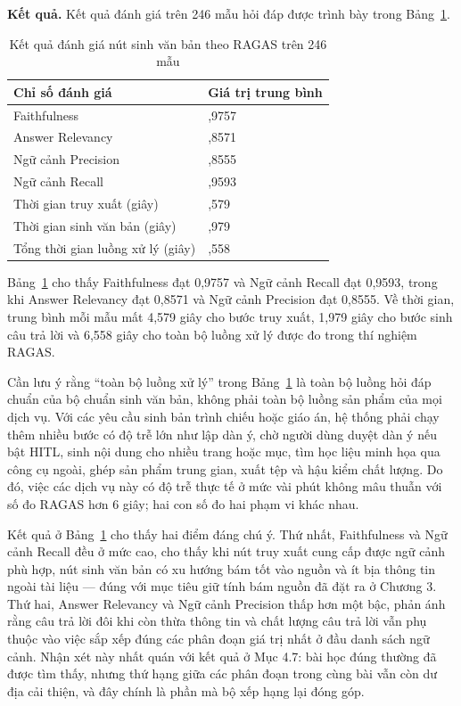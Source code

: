 \documentclass[../DoAn.tex]{subfiles}
\begin{document}
\textbf{Kết quả.} Kết quả đánh giá trên 246 mẫu hỏi đáp được trình bày trong Bảng~\ref{tab:generation-ragas}.

\begin{table}[H]
    \centering
    \renewcommand{\arraystretch}{1.25}
    \begin{tabular}{|p{}|>{\centering\arraybackslash}p{}|}
        \hline
        \textbf{Chỉ số đánh giá} & \textbf{Giá trị trung bình} \\
        \hline
        Faithfulness & 0,9757 \\
        \hline
        Answer Relevancy & 0,8571 \\
        \hline
        Ngữ cảnh Precision & 0,8555 \\
        \hline
        Ngữ cảnh Recall & 0,9593 \\
        \hline
        Thời gian truy xuất (giây) & 4,579 \\
        \hline
        Thời gian sinh văn bản (giây) & 1,979 \\
        \hline
        Tổng thời gian luồng xử lý (giây) & 6,558 \\
        \hline
    \end{tabular}
    \vspace{0.2cm}
\caption{Kết quả đánh giá nút sinh văn bản theo RAGAS trên 246 mẫu}
    \label{tab:generation-ragas}
\end{table}

Bảng~\ref{tab:generation-ragas} cho thấy Faithfulness đạt 0,9757 và Ngữ cảnh Recall đạt 0,9593, trong khi Answer Relevancy đạt 0,8571 và Ngữ cảnh Precision đạt 0,8555. Về thời gian, trung bình mỗi mẫu mất 4,579 giây cho bước truy xuất, 1,979 giây cho bước sinh câu trả lời và 6,558 giây cho toàn bộ luồng xử lý được đo trong thí nghiệm RAGAS.

Cần lưu ý rằng ``toàn bộ luồng xử lý'' trong Bảng~\ref{tab:generation-ragas} là toàn bộ luồng hỏi đáp chuẩn của bộ chuẩn sinh văn bản, không phải toàn bộ luồng sản phẩm của mọi dịch vụ. Với các yêu cầu sinh bản trình chiếu hoặc giáo án, hệ thống phải chạy thêm nhiều bước có độ trễ lớn như lập dàn ý, chờ người dùng duyệt dàn ý nếu bật HITL, sinh nội dung cho nhiều trang hoặc mục, tìm học liệu minh họa qua công cụ ngoài, ghép sản phẩm trung gian, xuất tệp và hậu kiểm chất lượng. Do đó, việc các dịch vụ này có độ trễ thực tế ở mức vài phút không mâu thuẫn với số đo RAGAS hơn 6 giây; hai con số đo hai phạm vi khác nhau.

Kết quả ở Bảng~\ref{tab:generation-ragas} cho thấy hai điểm đáng chú ý. Thứ nhất, Faithfulness và Ngữ cảnh Recall đều ở mức cao, cho thấy khi nút truy xuất cung cấp được ngữ cảnh phù hợp, nút sinh văn bản có xu hướng bám tốt vào nguồn và ít bịa thông tin ngoài tài liệu --- đúng với mục tiêu giữ tính bám nguồn đã đặt ra ở Chương 3. Thứ hai, Answer Relevancy và Ngữ cảnh Precision thấp hơn một bậc, phản ánh rằng câu trả lời đôi khi còn thừa thông tin và chất lượng câu trả lời vẫn phụ thuộc vào việc sắp xếp đúng các phân đoạn giá trị nhất ở đầu danh sách ngữ cảnh. Nhận xét này nhất quán với kết quả ở Mục 4.7: bài học đúng thường đã được tìm thấy, nhưng thứ hạng giữa các phân đoạn trong cùng bài vẫn còn dư địa cải thiện, và đây chính là phần mà bộ xếp hạng lại đóng góp.
\end{document}
